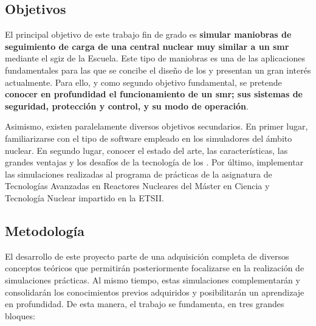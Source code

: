 \subsection{Objetivos}

El principal objetivo de este trabajo fin de grado es \textbf{simular maniobras de seguimiento de carga de una central nuclear muy similar a un \acrshort{smr}} mediante el \acrshort{sgiz} de la Escuela. Este tipo de maniobras es una de las aplicaciones fundamentales para las que se concibe el diseño de los  y presentan un gran interés actualmente. Para ello, y como segundo objetivo fundamental, se pretende \textbf{conocer en profundidad el funcionamiento de un \acrshort{smr}; sus sistemas de seguridad, protección y control, y su modo de operación}.

Asimismo, existen paralelamente diversos objetivos secundarios. En primer lugar, familiarizarse con el tipo de software empleado en los simuladores del ámbito nuclear. En segundo lugar, conocer el estado del arte, las características, las grandes ventajas y los desafíos de la tecnología de los . Por último, implementar las simulaciones realizadas al programa de prácticas de la asignatura de Tecnologías Avanzadas en Reactores Nucleares del Máster en Ciencia y Tecnología Nuclear impartido en la ETSII.

\subsection{Metodología}

El desarrollo de este proyecto parte de una adquisición completa de diversos conceptos teóricos que permitirán posteriormente focalizarse en la realización de simulaciones prácticas. Al mismo tiempo, estas simulaciones complementarán y consolidarán los conocimientos previos adquiridos y posibilitarán un aprendizaje en profundidad. De esta manera, el trabajo se fundamenta, en tres grandes bloques:

